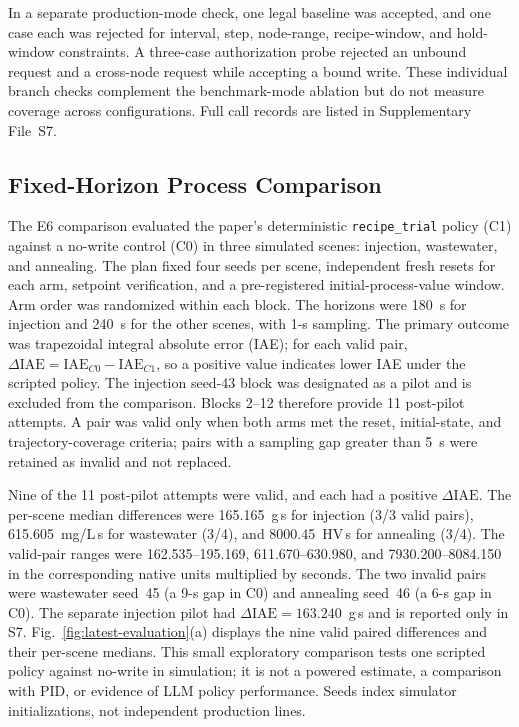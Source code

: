 In a separate production-mode check, one legal baseline was accepted, and one case each was rejected for interval, step, node-range, recipe-window, and hold-window constraints. A three-case authorization probe rejected an unbound request and a cross-node request while accepting a bound write. These individual branch checks complement the benchmark-mode ablation but do not measure coverage across configurations. Full call records are listed in Supplementary File~S7.

\subsection{Fixed-Horizon Process Comparison}
\label{sec:eval-optimization}
The E6 comparison evaluated the paper's deterministic \texttt{recipe\_trial} policy (C1) against a no-write control (C0) in three simulated scenes: injection, wastewater, and annealing. The plan fixed four seeds per scene, independent fresh resets for each arm, setpoint verification, and a pre-registered initial-process-value window. Arm order was randomized within each block. The horizons were 180~s for injection and 240~s for the other scenes, with 1-s sampling. The primary outcome was trapezoidal integral absolute error (IAE); for each valid pair, $\Delta\mathrm{IAE}=\mathrm{IAE}_{C0}-\mathrm{IAE}_{C1}$, so a positive value indicates lower IAE under the scripted policy. The injection seed-43 block was designated as a pilot and is excluded from the comparison. Blocks 2--12 therefore provide 11 post-pilot attempts. A pair was valid only when both arms met the reset, initial-state, and trajectory-coverage criteria; pairs with a sampling gap greater than 5~s were retained as invalid and not replaced.

Nine of the 11 post-pilot attempts were valid, and each had a positive $\Delta\mathrm{IAE}$. The per-scene median differences were 165.165~g\,s for injection (3/3 valid pairs), 615.605~mg/L\,s for wastewater (3/4), and 8000.45~HV\,s for annealing (3/4). The valid-pair ranges were 162.535--195.169, 611.670--630.980, and 7930.200--8084.150 in the corresponding native units multiplied by seconds. The two invalid pairs were wastewater seed~45 (a 9-s gap in C0) and annealing seed~46 (a 6-s gap in C0). The separate injection pilot had $\Delta\mathrm{IAE}=163.240$~g\,s and is reported only in S7. Fig.~\ref{fig:latest-evaluation}(a) displays the nine valid paired differences and their per-scene medians. This small exploratory comparison tests one scripted policy against no-write in simulation; it is not a powered estimate, a comparison with PID, or evidence of LLM policy performance. Seeds index simulator initializations, not independent production lines.


